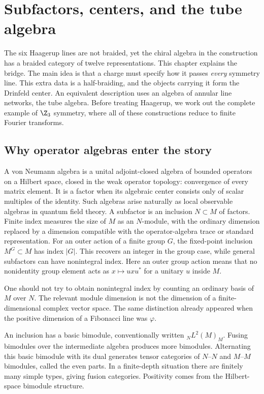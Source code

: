 \chapter{Subfactors, centers, and the tube algebra}
\label{ch:centers}

The six Haagerup lines are not braided, yet the chiral algebra in the
construction has a braided category of twelve representations.  This
chapter explains the bridge.  The main idea is that a charge must
specify how it passes \emph{every} symmetry line.  This extra data is
a half-braiding, and the objects carrying it form the Drinfeld center.
An equivalent description uses an algebra of annular line networks,
the tube algebra.  Before treating Haagerup, we work out the complete
example of $\Z_3$ symmetry, where all of these constructions reduce
to finite Fourier transforms.

\section{Why operator algebras enter the story}

A von Neumann algebra is a unital adjoint-closed algebra of bounded
operators on a Hilbert space, closed in the weak operator topology:
convergence of every matrix element. It is a factor when its algebraic
center consists only of scalar multiples of the identity. Such algebras
arise naturally as local observable algebras in quantum field theory.
A subfactor is an inclusion $N\subset M$ of factors.  Finite index
measures the size of $M$ as an $N$-module, with the ordinary dimension
replaced by a dimension compatible with the operator-algebra trace or
standard representation.  For an outer action of a finite group $G$,
the fixed-point inclusion $M^G\subset M$ has index $|G|$.  This
recovers an integer in the group case, while general subfactors can
have nonintegral index.
Here an outer group action means that no nonidentity group element
acts as $x\mapsto uxu^*$ for a unitary $u$ inside $M$.

One should not try to obtain nonintegral index by counting an ordinary
basis of $M$ over $N$.  The relevant module dimension is not the
dimension of a finite-dimensional complex vector space.  The same
distinction already appeared when the positive dimension of a
Fibonacci line was $\varphi$.

An inclusion has a basic bimodule, conventionally written
${}_N L^2(M)_M$.  Fusing bimodules over the intermediate algebra
produces more bimodules.  Alternating this basic bimodule with its
dual generates tensor categories of $N$--$N$ and $M$--$M$
bimodules, called the even parts.  In a finite-depth situation there
are finitely many simple types, giving fusion categories.  Positivity
comes from the Hilbert-space bimodule structure.

